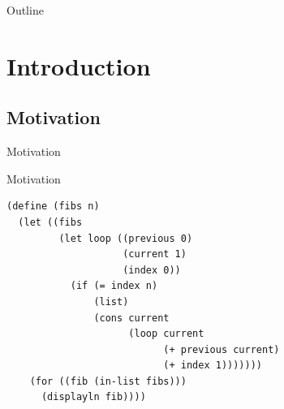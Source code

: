\documentclass[xcolor=dvipsnames, 14pt]{beamer}
\begin{document}
\begin{frame}{Outline}
  \tableofcontents[] %
\end{frame}

\section{Introduction}
\subsection{Motivation}

\begin{frame}{Motivation}
\end{frame}
\begin{frame}[fragile]{Motivation}
\begin{Verbatim}[fontsize=\footnotesize]
(define (fibs n)
  (let ((fibs
         (let loop ((previous 0)
                    (current 1)
                    (index 0))
           (if (= index n)
               (list)
               (cons current
                     (loop current
                           (+ previous current)
                           (+ index 1)))))))
    (for ((fib (in-list fibs)))
      (displayln fib))))
\end{Verbatim}
\end{frame}
\end{document}
